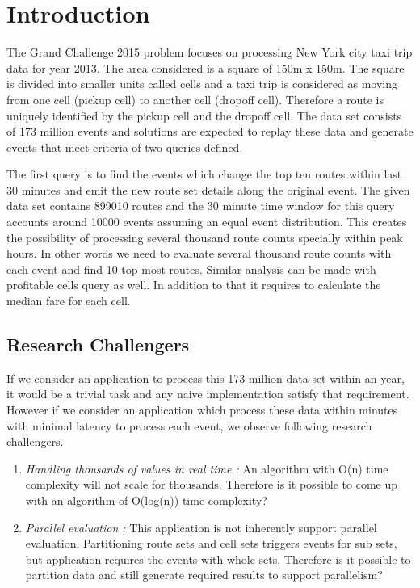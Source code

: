\section{Introduction}

The Grand Challenge 2015 problem focuses on processing New York city taxi trip data for year 2013. The area considered is a square of 150m x  150m. The  square is divided into smaller units called cells and a taxi trip is considered as moving from one cell (pickup cell) to another cell (dropoff cell). Therefore a route is uniquely identified by the pickup cell and the dropoff cell. The data set consists of 173 million events and solutions are expected to replay these data and generate events that meet criteria of two queries defined. 

The first query is to find the events which change the top ten routes within last 30 minutes and emit the new route set details along the original event. The given data set contains 899010  routes and the 30 minute time window for this query accounts around 10000 events assuming an equal event distribution. This creates the possibility of processing several thousand route counts specially within peak hours. In other words we need to evaluate several thousand route counts with each event and find 10 top most routes. Similar analysis can be made with profitable cells query as well. In addition to that it requires to  calculate the median fare for each cell. 

\subsection{Research Challengers}

If we consider an application to process this 173 million data set within an year, it would be a trivial task and any naive implementation satisfy that requirement. However if we consider an application which process these data within minutes with minimal latency to process each event, we observe following research challengers.
\begin{enumerate}
	\item \textit{Handling thousands of values in real time :}  An algorithm with O(n) time complexity will not scale for thousands. Therefore is it possible to come up with an algorithm of O(log(n)) time complexity?
	\item \textit{Parallel evaluation :}  This application is not inherently support parallel evaluation. Partitioning route sets and cell sets triggers events for sub sets, but application requires the events with whole sets. Therefore is it possible to partition data and still generate required results to support parallelism?  
\end{enumerate}


